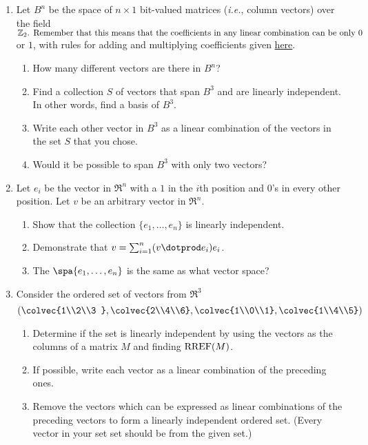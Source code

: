 


\begin{enumerate}
\item \label{bitsprob}Let $B^n$ be the space of $n\times 1$ bit-valued matrices ({\it i.e.}, column vectors) over the field \({\mathbb Z}_2$.
Remember that this means that the coefficients in any linear combination can be only \(0\) or \(1\), with rules for adding and multiplying coefficients given \hyperref[Z2]{here}.  
\begin{enumerate}
\item How many different vectors are there in $B^n$?
\item  Find a collection $S$ of vectors that span $B^3$ and are linearly independent.  In other words, find a basis of $B^3$.
\item Write each other vector in $B^3$ as a linear combination of the vectors in the set $S$ that you chose.
\item Would it be possible to span $B^3$ with only two vectors?
\end{enumerate}



\item \label{stdbasis} Let $e_i$ be the vector in $\Re^n$ with a $1$ in the $i$th position and $0$'s in every other position.  Let $v$ be an arbitrary vector in $\Re^n$.
\begin{enumerate}
\item Show that the collection $\{e_1, \ldots, e_n \}$ is linearly independent.
\item Demonstrate that $v=\sum_{i=1}^n (v\dotprod e_i)e_i$.
\item The $\spa \{e_1, \ldots, e_n \}$ is the same as what vector space?
\end{enumerate}


\item Consider the ordered set of vectors from $\Re^3$
$$
\left( \colvec{1\\2\\3 } , \colvec{2\\4\\6}, \colvec{1\\0\\1} , \colvec{1\\4\\5} \right) 
$$
\begin{enumerate}
\item Determine if the set is linearly independent by using the vectors as the columns of a matrix $M$ and finding ${\rm RREF}(M)$.
\item If possible, write each vector as a linear combination of the preceding ones.
\item Remove the vectors which can be expressed as linear combinations of the preceding vectors to form a linearly independent ordered set. (Every vector in your set set should be from the given set.)
\end{enumerate}


\end{enumerate}
